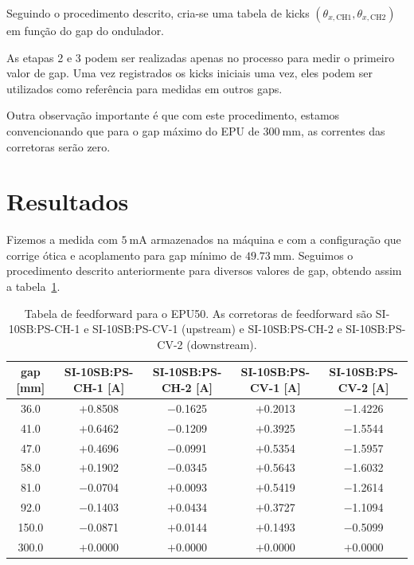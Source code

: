 \documentclass[a4paper,
               keeplastbox,   %
               ]{jacow}
\begin{document}
Seguindo o procedimento descrito, cria-se uma tabela de kicks $\left(\theta_{x, \mathrm{CH1}},\theta_{x, \mathrm{CH2}}\right)$ em função do gap do ondulador.

As etapas 2 e 3 podem ser realizadas apenas no processo para medir o primeiro valor de gap. Uma vez registrados os kicks iniciais uma vez, eles podem ser utilizados como referência para medidas em outros gaps. 

Outra observação importante é que com este procedimento, estamos convencionando que para o gap máximo do EPU de $\SI{300}{\milli\meter}$, as correntes das corretoras serão zero.

\section{Resultados}
Fizemos a medida com $\SI{5}{\milli\ampere}$ armazenados na máquina e com a configuração que corrige ótica e acoplamento para gap mínimo de $\SI{49.73}{\milli\meter}$. Seguimos o procedimento descrito anteriormente para diversos valores de gap, obtendo assim a tabela~\ref{tab:ffwd_table}.

\begin{table}[!h]
\caption{Tabela de feedforward para o EPU50. As corretoras de feedforward são SI-10SB:PS-CH-1 e SI-10SB:PS-CV-1 (upstream) e SI-10SB:PS-CH-2 e SI-10SB:PS-CV-2 (downstream).}
\centering
\begin{tabular}{ccccc}
\hline
\hline
gap {[}mm{]} & SI-10SB:PS-CH-1 {[}A{]} & SI-10SB:PS-CH-2 {[}A{]} & SI-10SB:PS-CV-1 {[}A{]} & SI-10SB:PS-CV-2 {[}A{]} \\
\hline\hline
36.0                 & $+$0.8508   & $-$0.1625   & $+$0.2013   & $-$1.4226 \\ \hline
41.0                 & $+$0.6462   & $-$0.1209   & $+$0.3925   & $-$1.5544 \\ \hline
47.0                 & $+$0.4696   & $-$0.0991   & $+$0.5354   & $-$1.5957 \\ \hline
58.0                 & $+$0.1902   & $-$0.0345   & $+$0.5643   & $-$1.6032 \\ \hline
81.0                 & $-$0.0704   & $+$0.0093   & $+$0.5419   & $-$1.2614 \\ \hline
92.0                 & $-$0.1403   & $+$0.0434   & $+$0.3727   & $-$1.1094 \\ \hline
150.0                & $-$0.0871   & $+$0.0144   & $+$0.1493   & $-$0.5099 \\ \hline
300.0                & $+$0.0000   & $+$0.0000   & $+$0.0000   & $+$0.0000 \\
\hline
\hline
\end{tabular}
\label{tab:ffwd_table}
\end{table}
\end{document}
